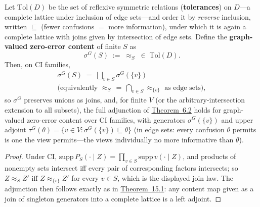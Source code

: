 \begin{thmplain}

Let \(\mathrm{Tol}(D)\) be the set of reflexive symmetric relations (\textbf{tolerances}) on \(D\)---\hspace{0pt}a complete lattice under inclusion of edge sets---\hspace{0pt}and order it by \emph{reverse} inclusion, written \(\sqsubseteq\) (fewer confusions \(=\) more information), under which it is again a complete lattice with joins given by intersection of edge sets. Define the \textbf{graph-valued zero-error content} of finite \(S\) as
\[
\sigma^{G}(S) \;:=\; \approx_S \;\in\; \mathrm{Tol}(D).
\]
Then, on CI families,
\[\begin{gathered}\sigma^{G}(S) \;=\; \bigsqcup_{v \in S} \sigma^{G}(\{v\}) \\ \big(\text{equivalently } \approx_S \,=\, \textstyle\bigcap_{v \in S} \approx_{\{v\}} \text{ as edge sets}\big),\end{gathered}\]
so \(\sigma^{G}\) preserves unions as joins, and, for finite \(V\) (or the arbitrary-intersection extension to all subsets), the full adjunction of \hyperlink{stmt:6.2}{Theorem~6.2} holds for graph-valued zero-error content over CI families, with generators \(\sigma^{G}(\{v\})\) and upper adjoint \(\tau^{G}(\theta) = \{v \in V : \sigma^{G}(\{v\}) \sqsubseteq \theta\}\) (in edge sets: every confusion \(\theta\) permits is one the view permits---\hspace{0pt}the views individually no more informative than \(\theta\)).
\end{thmplain}

\begin{proof}

Under CI, \(\mathrm{supp}\, P_S(\cdot \mid Z) = \prod_{v \in S} \mathrm{supp}\, v(\cdot \mid Z)\), and products of nonempty sets intersect iff every pair of corresponding factors intersects; so \(Z \approx_S Z'\) iff \(Z \approx_{\{v\}} Z'\) for every \(v \in S\), which is the displayed join law. The adjunction then follows exactly as in \hyperlink{stmt:15.1}{Theorem~15.1}: any content map given as a join of singleton generators into a complete lattice is a left adjoint.
\end{proof}

